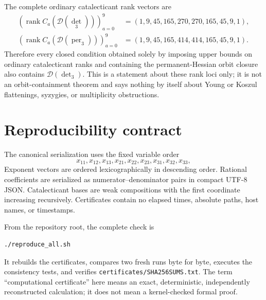 \documentclass[11pt]{article}
\theoremstyle{remark}
\DeclareMathOperator{\per}{per}
\newcommand{\Dcal}{\mathcal D}
\begin{document}
The complete ordinary catalecticant rank vectors are
\begin{align*}
 (\operatorname{rank}C_a(\Dcal(\det_3)))_{a=0}^{9}
   &=(1,9,45,165,270,270,165,45,9,1),\\
 (\operatorname{rank}C_a(\Dcal(\per_3)))_{a=0}^{9}
   &=(1,9,45,165,414,414,165,45,9,1).
\end{align*}
Therefore every closed condition obtained solely by imposing upper bounds on ordinary catalecticant ranks and containing the permanent-Hessian orbit closure also contains $\Dcal(\det_3)$.  This is a statement about these rank loci only; it is not an orbit-containment theorem and says nothing by itself about Young or Koszul flattenings, syzygies, or multiplicity obstructions.

\section{Reproducibility contract}
The canonical serialization uses the fixed variable order
\[
 x_{11},x_{12},x_{13},x_{21},x_{22},x_{23},x_{31},x_{32},x_{33},
\]
Exponent vectors are ordered lexicographically in descending order.  Rational coefficients are serialized as numerator--denominator pairs in compact UTF-8 JSON.  Catalecticant bases are weak compositions with the first coordinate increasing recursively.  Certificates contain no elapsed times, absolute paths, host names, or timestamps.

From the repository root, the complete check is
\begin{verbatim}
./reproduce_all.sh
\end{verbatim}
It rebuilds the certificates, compares two fresh runs byte for byte, executes the consistency tests, and verifies \texttt{certificates/SHA256SUMS.txt}.  The term ``computational certificate'' here means an exact, deterministic, independently reconstructed calculation; it does not mean a kernel-checked formal proof.
\end{document}
